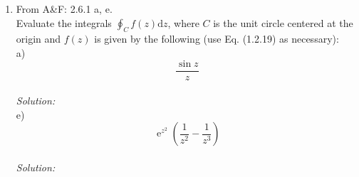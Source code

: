 \documentclass[10pt]{amsart}
\newcommand{\D}{\mathrm{d}}
\DeclareMathOperator{\E}{e}
\theoremstyle{nonumberplain}
\begin{document}
\begin{enumerate}[label={\bf {\arabic*}:}]
\item From A\&F: 2.6.1 a, e.\\
Evaluate the integrals $\oint_C f(z) \D z$, where $C$ is the unit circle centered at the origin and $f(z)$ is given by the following (use Eq. (1.2.19) as necessary): \\
a)
$$
\frac{\sin z}{z}
$$
\\
\textit{Solution:}\\
e)
$$
\E^{z^2}\left(\frac{1}{z^2} - \frac{1}{z^3}\right)
$$
\\
\textit{Solution:}\\
\end{enumerate}
\end{document}
